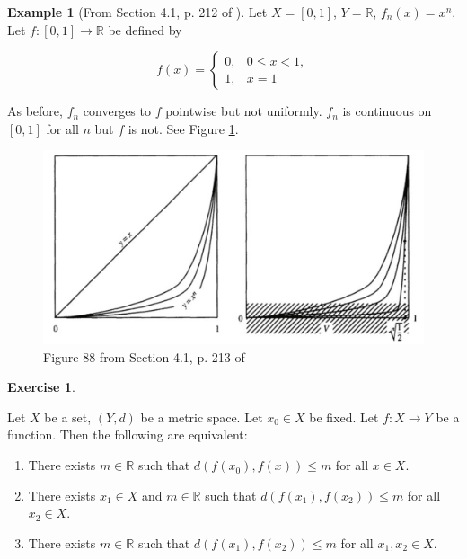 \documentclass{article}
\theoremstyle{definition}
\theoremstyle{definition}
\theoremstyle{definition}
\theoremstyle{definition}
\theoremstyle{definition}
\theoremstyle{definition}
\newtheorem{exercise}{Exercise}
\theoremstyle{definition}
\newtheorem{example}{Example}[section]
\begin{document}
\begin{example}[From Section 4.1, p. 212 of \citet{pugh2015real}]

Let \(X = [0,1]\), \(Y = \mathbb{R}\), \(f_n(x) = x^n\). Let \(f:[0,1] \to \mathbb{R}\) be defined by 

\[
f(x) = \begin{cases}
0, & 0 \leq x < 1, \\
1, & x=1
\end{cases}
\]

As before, \(f_n\) converges to \(f\) pointwise but not uniformly. \(f_n\) is continuous on \([0,1]\) for all \(n\) but \(f\) is not. See Figure \ref{ra.fig.88}.

\begin{figure}[htbp]
\begin{center}
\includegraphics[scale=0.5]{ra_fig88}
\caption{Figure 88 from Section 4.1, p. 213 of \citet{pugh2015real}}
\label{ra.fig.88}
\end{center}
\end{figure}


\end{example}

\begin{exercise}\label{ra.425b.bounded}

Let \(X\) be a set, \((Y, d)\) be a metric space. Let \(x_0 \in X\) be fixed. Let \(f: X \to Y\) be a function. Then the following are equivalent:

\begin{enumerate}

\item There exists \(m \in \mathbb{R}\) such that \(d(f(x_0), f(x)) \leq m\) for all \(x \in X\). 

\item There exists \(x_1 \in X\) and \(m \in \mathbb{R}\) such that \(d(f(x_1), f(x_2)) \leq m\) for all \(x_2 \in X\).

\item There exists \(m \in \mathbb{R}\) such that \(d(f(x_1), f(x_2)) \leq m\) for all \(x_1, x_2 \in  X\). 

\end{enumerate}

\end{exercise}
\end{document}
